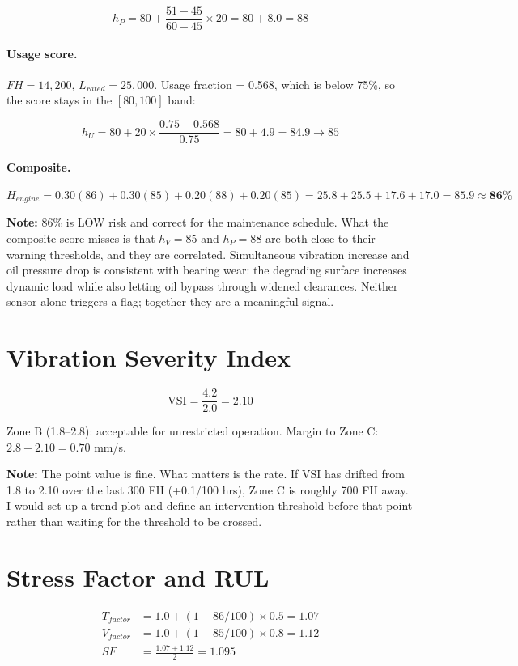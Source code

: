 \documentclass[11pt, a4paper]{report}
\begin{document}
\[
h_P = 80 + \frac{51 - 45}{60 - 45} \times 20 = 80 + 8.0 = 88
\]

\paragraph{Usage score.} $FH = 14{,}200$, $L_{rated} = 25{,}000$.
Usage fraction = 0.568, which is below 75\%, so the score stays in the
$[80, 100]$ band:

\[
h_U = 80 + 20 \times \frac{0.75 - 0.568}{0.75} = 80 + 4.9 = 84.9 \rightarrow 85
\]

\paragraph{Composite.}

\[
H_{engine} = 0.30(86) + 0.30(85) + 0.20(88) + 0.20(85)
           = 25.8 + 25.5 + 17.6 + 17.0 = \mathbf{85.9 \approx 86\%}
\]

\medskip
\noindent\textbf{Note:} 86\% is LOW risk and correct for the maintenance
schedule. What the composite score misses is that $h_V = 85$ and $h_P = 88$
are both close to their warning thresholds, and they are correlated. Simultaneous
vibration increase and oil pressure drop is consistent with bearing wear: the
degrading surface increases dynamic load while also letting oil bypass through
widened clearances. Neither sensor alone triggers a flag; together they are a
meaningful signal.

\section{Vibration Severity Index}

\[
\text{VSI} = \frac{4.2}{2.0} = \mathbf{2.10}
\]

Zone B (1.8--2.8): acceptable for unrestricted operation.
Margin to Zone C: $2.8 - 2.10 = 0.70$ mm/s.

\medskip
\noindent\textbf{Note:} The point value is fine. What matters is the rate.
If VSI has drifted from 1.8 to 2.10 over the last 300 FH (+0.1/100 hrs),
Zone C is roughly 700 FH away. I would set up a trend plot and define an
intervention threshold before that point rather than waiting for the threshold
to be crossed.

\section{Stress Factor and RUL}

\begin{align}
  T_{factor} &= 1.0 + (1 - 86/100) \times 0.5 = 1.07 \\[4pt]
  V_{factor} &= 1.0 + (1 - 85/100) \times 0.8 = 1.12 \\[4pt]
  SF         &= \frac{1.07 + 1.12}{2} = \mathbf{1.095}
\end{align}
\end{document}
